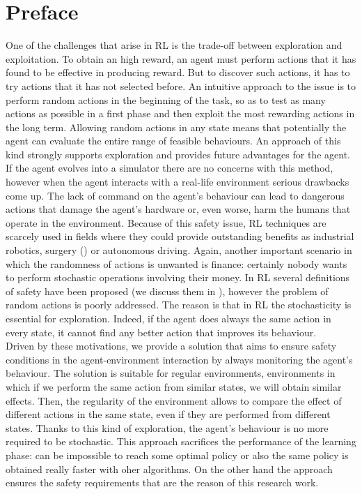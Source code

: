 

\chapter*{Preface}
One of the challenges that arise in \acf{RL} is the trade-off between exploration and exploitation. To obtain an high reward, an agent must perform actions that it has found to be effective in producing reward. But to discover such actions, it has to try actions that it has not selected before. An intuitive approach to the issue is to perform random actions in the beginning of the task, so as to test as many actions as possible in a first phase and then exploit the most rewarding actions in the long term. Allowing random actions in any state means that potentially the agent can evaluate the entire range of feasible behaviours. An approach of this kind strongly supports exploration and provides future advantages for the agent.\\
\newline
If the agent evolves into a simulator there are no concerns with this method, however when the agent interacts with a real-life environment serious drawbacks come up. The lack of command on the agent's behaviour can lead to dangerous actions that damage the agent's hardware or, even worse, harm the humans that operate in the environment. Because of this safety issue, \ac{RL} techniques are scarcely used in fields where they could provide outstanding benefits as industrial robotics, surgery (\cite{baek2018PathPlanning}) or autonomous driving. Again, another important scenario in which the randomness of actions is unwanted is finance: certainly nobody wants to perform stochastic operations involving their money. In \ac{RL} several definitions of safety have been proposed (we discuss them in ), however the problem of random actions is poorly addressed. The reason is that in \ac{RL} the stochasticity is essential for exploration. Indeed, if the agent does always the same action in every state, it cannot find any better action that improves its behaviour.\\
\newline
Driven by these motivations, we provide a solution that aims to ensure safety conditions in the agent-environment interaction by always monitoring the agent's behaviour. The solution is suitable for regular environments, \ie environments in which if we perform the same action from similar states, we will obtain similar effects. Then, the regularity of the environment allows to compare the effect of different actions in the same state, even if they are performed from different states. Thanks to this kind of exploration, the agent's behaviour is no more required to be stochastic. This approach sacrifices the performance of the learning phase: can be impossible to reach some optimal policy or also the same policy is obtained really faster with oher algorithms. On the other hand the approach ensures the safety requirements that are the reason of this research work.
